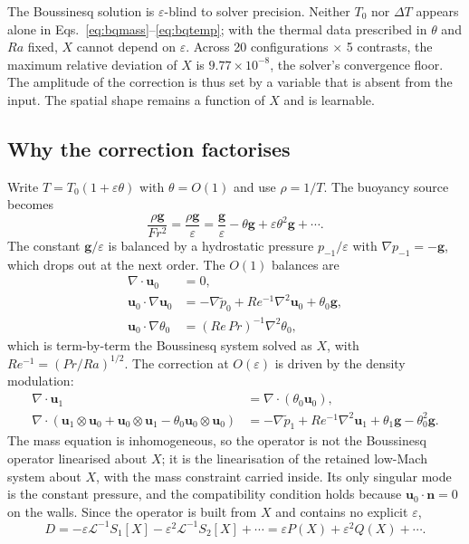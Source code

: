 \documentclass[preprint,11pt,a4paper,times]{elsarticle}
\begin{document}
The Boussinesq solution is $\varepsilon$-blind to solver precision. Neither $T_0$ nor $\Delta T$ appears
alone in Eqs.~\eqref{eq:bqmass}--\eqref{eq:bqtemp}; with the thermal data prescribed in
$\theta$ and $Ra$ fixed, $X$ cannot depend on $\varepsilon$. Across 20 configurations
$\times$ 5 contrasts, the maximum relative deviation of $X$ is $9.77\times10^{-8}$, the
solver's convergence floor. The amplitude of the correction is thus set by a variable that is
absent from the input. The spatial shape remains a function of $X$ and is learnable.

\subsection{Why the correction factorises}

Write $T=T_0(1+\varepsilon\theta)$ with $\theta=O(1)$ and use $\rho=1/T$. The buoyancy source
becomes
\begin{equation}
  \frac{\rho\bm g}{Fr^2}=\frac{\rho\bm g}{\varepsilon}
  =\frac{\bm g}{\varepsilon}-\theta\bm g+\varepsilon\theta^2\bm g+\cdots.
  \label{eq:buoy}
\end{equation}
The constant $\bm g/\varepsilon$ is balanced by a hydrostatic pressure $p_{-1}/\varepsilon$
with $\nabla p_{-1}=-\bm g$, which drops out at the next order. The $O(1)$ balances are
\begin{align}
  \nabla\cdot\bm u_0&=0,\label{eq:o1mass}\\
  \bm u_0\cdot\nabla\bm u_0&=-\nabla\tilde p_0+Re^{-1}\nabla^2\bm u_0+\theta_0\bm g,\\
  \bm u_0\cdot\nabla\theta_0&=(Re\,Pr)^{-1}\nabla^2\theta_0,\label{eq:o1temp}
\end{align}
which is term-by-term the Boussinesq system solved as $X$, with
$Re^{-1}=(Pr/Ra)^{1/2}$. The correction at $O(\varepsilon)$ is driven by the density
modulation:
\begin{align}
  \nabla\cdot\bm u_1&=\nabla\cdot(\theta_0\bm u_0),\label{eq:div1}\\
  \nabla\cdot(\bm u_1\otimes\bm u_0+\bm u_0\otimes\bm u_1
  -\theta_0\bm u_0\otimes\bm u_0)
  &=-\nabla\tilde p_1+Re^{-1}\nabla^2\bm u_1+\theta_1\bm g-\theta_0^2\bm g.
  \label{eq:mom1}
\end{align}
The mass equation is inhomogeneous, so the operator is not the Boussinesq operator
linearised about $X$; it is the linearisation of the retained low-Mach system about $X$, with
the mass constraint carried inside. Its only singular mode is the constant pressure, and the
compatibility condition holds because $\bm u_0\cdot\bm n=0$ on the walls. Since the operator
is built from $X$ and contains no explicit $\varepsilon$,
\begin{equation}
  D=-\varepsilon\mathcal L^{-1}S_1[X]-\varepsilon^2\mathcal L^{-1}S_2[X]+\cdots
  =\varepsilon P(X)+\varepsilon^2 Q(X)+\cdots.
  \label{eq:expansion}
\end{equation}
\end{document}
